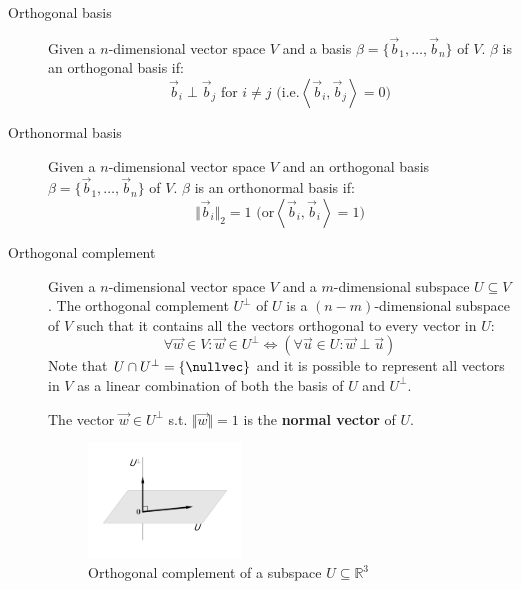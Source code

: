 \begin{description}
    \item[Orthogonal basis] 
        Given a $n$-dimensional vector space $V$ and a basis $\beta = \{ \vec{b}_1, \dots, \vec{b}_n \}$ of $V$.
        $\beta$ is an orthogonal basis if:
        \[ \vec{b}_i \perp \vec{b}_j \text{ for } i \neq j \text{ (i.e.} \left\langle \vec{b}_i, \vec{b}_j \right\rangle = 0 \text{)} \]

    \item[Orthonormal basis] 
        Given a $n$-dimensional vector space $V$ and an orthogonal basis $\beta = \{ \vec{b}_1, \dots, \vec{b}_n \}$ of $V$.
        $\beta$ is an orthonormal basis if:
        \[ \Vert \vec{b}_i \Vert_2 = 1 \text{ (or} \left\langle \vec{b}_i, \vec{b}_i \right\rangle = 1 \text{)} \]
    
    \item[Orthogonal complement] 
        Given a $n$-dimensional vector space $V$ and a $m$-dimensional subspace $U \subseteq V$.
        The orthogonal complement $U^\perp$ of $U$ is a $(n-m)$-dimensional subspace of $V$ such that it
        contains all the vectors orthogonal to every vector in $U$:
        \[ \forall \vec{w} \in V: \vec{w} \in U^\perp \iff (\forall \vec{u} \in U: \vec{w} \perp \vec{u}) \]
        Note that $U \cap U^\perp = \{ \nullvec \}$ and 
        it is possible to represent all vectors in $V$ as a linear combination of both the basis of $U$ and $U^\perp$.
        
        The vector $\vec{w} \in U^\perp$ s.t. $\Vert \vec{w} \Vert = 1$ is the \textbf{normal vector} of $U$. 
        \begin{figure}[ht]
            \centering
            \includegraphics[width=0.4\textwidth]{img/_orthogonal_complement.pdf}
            \caption{Orthogonal complement of a subspace $U \subseteq \mathbb{R}^3$}
        \end{figure}
\end{description}



